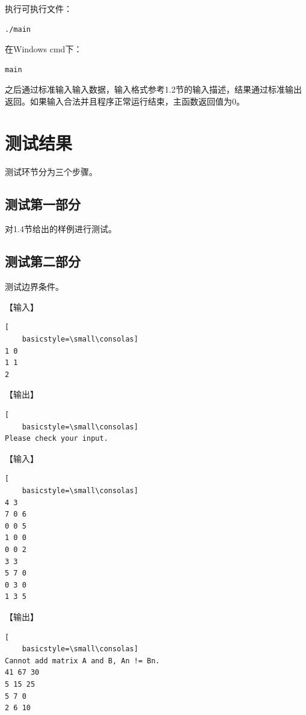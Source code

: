 \documentclass{article}
\begin{document}
执行可执行文件：

\begin{lstlisting}[language={bash},
    basicstyle=\small\consolas]
./main
\end{lstlisting}

在Windows cmd下：

\begin{lstlisting}[language={bash},
    basicstyle=\small\consolas]
main
\end{lstlisting}

之后通过标准输入输入数据，输入格式参考1.2节的输入描述，结果通过标准输出返回。如果输入合法并且程序正常运行结束，主函数返回值为0。

\section{测试结果}

测试环节分为三个步骤。

\subsection{测试第一部分}

对1.4节给出的样例进行测试。

\subsection{测试第二部分}

测试边界条件。

【输入】

\begin{lstlisting}[
    basicstyle=\small\consolas]
1 0
1 1
2
\end{lstlisting}

【输出】

\begin{lstlisting}[
    basicstyle=\small\consolas]
Please check your input.
\end{lstlisting}

【输入】

\begin{lstlisting}[
    basicstyle=\small\consolas]
4 3
7 0 6
0 0 5
1 0 0
0 0 2
3 3
5 7 0
0 3 0
1 3 5
\end{lstlisting}

【输出】

\begin{lstlisting}[
    basicstyle=\small\consolas]
Cannot add matrix A and B, An != Bn.
41 67 30 
5 15 25 
5 7 0 
2 6 10 
\end{lstlisting}
\end{document}
